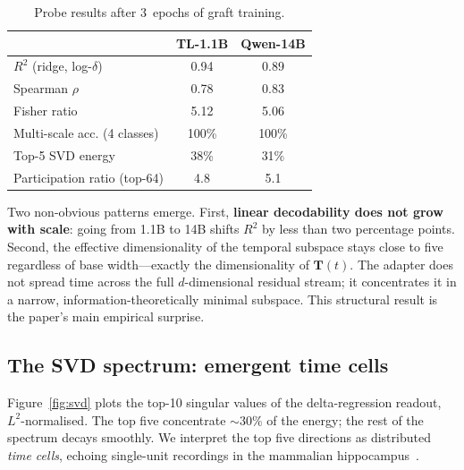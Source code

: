 \documentclass[10pt,twocolumn,letterpaper]{article}
\begin{document}
\begin{table}[H]
\centering
\small
\caption{Probe results after 3~epochs of graft training.}
\label{tab:probes}
\begin{tabular}{@{}lcc@{}}
\toprule
 & \textbf{TL-1.1B} & \textbf{Qwen-14B} \\
\midrule
$R^2$ (ridge, log-$\delta$)        & 0.94   & 0.89 \\
Spearman $\rho$                    & 0.78   & 0.83 \\
Fisher ratio                       & 5.12   & 5.06 \\
Multi-scale acc. (4 classes)       & 100\%  & 100\% \\
Top-5 SVD energy                   & 38\%   & 31\% \\
Participation ratio (top-64)       & 4.8    & 5.1 \\
\bottomrule
\end{tabular}
\end{table}

Two non-obvious patterns emerge. First, \textbf{linear decodability does not grow with scale}: going from 1.1B to 14B shifts $R^2$ by less than two percentage points. Second, the effective dimensionality of the temporal subspace stays close to five regardless of base width---exactly the dimensionality of $\mathbf{T}(t)$. The adapter does not spread time across the full $d$-dimensional residual stream; it concentrates it in a narrow, information-theoretically minimal subspace. This structural result is the paper's main empirical surprise.

\subsection{The SVD spectrum: emergent time cells}

Figure~\ref{fig:svd} plots the top-10 singular values of the delta-regression readout, $L^2$-normalised. The top five concentrate $\sim\!30\%$ of the energy; the rest of the spectrum decays smoothly. We interpret the top five directions as distributed \emph{time cells}, echoing single-unit recordings in the mammalian hippocampus~\cite{macdonald2011}.
\end{document}
